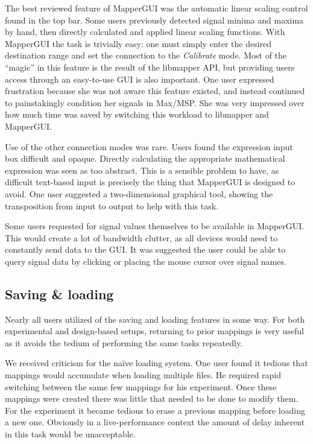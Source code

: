 The best reviewed feature of MapperGUI was the automatic linear scaling control found in the top bar. Some users previously detected signal minima and maxima by hand, then directly calculated and applied linear scaling functions. With MapperGUI the task is trivially easy: one must simply enter the desired destination range and set the connection to the \emph{Calibrate} mode. Most of the ``magic'' in this feature is the result of the libmapper API, but providing users access through an easy-to-use GUI is also important. One user expressed frustration because she was not aware this feature existed, and instead continued to painstakingly condition her signals in Max/MSP. She was very impressed over how much time was saved by switching this workload to libmapper and MapperGUI.

Use of the other connection modes was rare. Users found the expression input box difficult and opaque. Directly calculating the appropriate mathematical expression was seen as too abstract. This is a sensible problem to have, as difficult text-based input is precisely the thing that MapperGUI is designed to avoid. One user suggested a two-dimensional graphical tool, showing the transposition from input to output to help with this task. 

Some users requested for signal values themselves to be available in MapperGUI. This would create a lot of bandwidth clutter, as all devices would need to constantly send data to the GUI. It was suggested the user could be able to query signal data by clicking or placing the mouse cursor over signal names.
	

	\subsection{Saving \& loading} %
	\label{sub:saving_and_loading}

Nearly all users utilized of the saving and loading features in some way. For both experimental and design-based setups, returning to prior mappings is very useful as it avoids the tedium of performing the same tasks repeatedly.

We received criticism for the na\"ive loading system. One user found it tedious that mappings would accumulate when loading multiple files. He required rapid switching between the same few mappings for his experiment. Once these mappings were created there was little that needed to be done to modify them. For the experiment it became tedious to erase a previous mapping before loading a new one. Obviously in a live-performance context the amount of delay inherent in this task would be unacceptable. 

